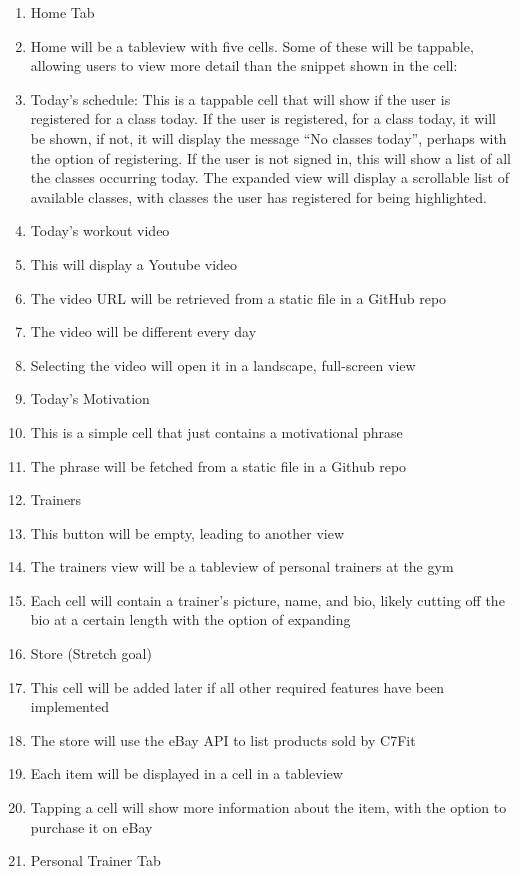 \documentclass[letterpaper,10pt,titlepage]{article}
\begin{document}
\begin{enumerate}
\item Home Tab
\item Home will be a tableview with five cells. Some of these will be tappable, allowing users to view more detail than the snippet shown in the cell:
\item Today's schedule: This is a tappable cell that will show if the user is registered for a class today. If the user is registered, for a class today, it will be shown, if not, it will display the message “No classes today”, perhaps with the option of registering. If the user is not signed in, this will show a list of all the classes occurring today. The expanded view will display a scrollable list of available classes, with classes the user has registered for being highlighted.
\item Today's workout video
\item This will display a Youtube video
\item The video URL will be retrieved from a static file in a GitHub repo
\item The video will be different every day
\item Selecting the video will open it in a landscape, full-screen view
\item Today's Motivation
\item This is a simple cell that just contains a motivational phrase
\item The phrase will be fetched from a static file in a Github repo
\item Trainers
\item This button will be empty, leading to another view
\item The trainers view will be a tableview of personal trainers at the gym
\item Each cell will contain a trainer's picture, name, and bio, likely cutting off the bio at a certain length with the option of expanding
\item Store (Stretch goal)
\item This cell will be added later if all other required features have been implemented
\item The store will use the eBay API to list products sold by C7Fit
\item Each item will be displayed in a cell in a tableview
\item Tapping a cell will show more information about the item, with the option to purchase it on eBay
\item Personal Trainer Tab

\end{enumerate}
\end{document}
